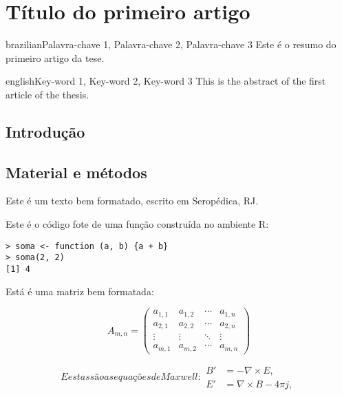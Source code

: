 \artigotrue
\chapter{Título do primeiro artigo}
\label{chap:chapter01}

\begin{chapterabstract}{brazilian}{Palavra-chave 1, Palavra-chave 2, Palavra-chave 3}
Este é o resumo do primeiro artigo da tese.
\end{chapterabstract}

\begin{chapterabstract}{english}{Key-word 1, Key-word 2, Key-word 3}
This is the abstract of the first article of the thesis.
\end{chapterabstract}

\formatchapter

\section{Introdução}

\blindtext[2]

\section{Material e métodos}

Este é um texto bem formatado, escrito em Seropédica, RJ. \blindtext[1]

Este é o código fote de uma função construída no ambiente R:

\begin{verbatim}
> soma <- function (a, b) {a + b}
> soma(2, 2)
[1] 4
\end{verbatim}

Está é uma matriz bem formatada:

\begin{equation}
  A_{m,n} =
 \begin{pmatrix}
  a_{1,1} & a_{1,2} & \cdots & a_{1,n} \\
  a_{2,1} & a_{2,2} & \cdots & a_{2,n} \\
  \vdots  & \vdots  & \ddots & \vdots  \\
  a_{m,1} & a_{m,2} & \cdots & a_{m,n}
 \end{pmatrix}
\end{equation}

\begin{subequations}\label{eq:maxwell}
E estas são as equações de Maxwell:
\begin{align}
        B'&=-\nabla \times E,\\
        E'&=\nabla \times B - 4\pi j,
\end{align}
\end{subequations}

